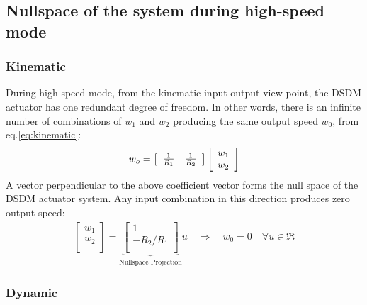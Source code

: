 \newpage
\subsection{Nullspace of the system during high-speed mode}

\subsubsection{Kinematic}

During high-speed mode, from the kinematic input-output view point, the DSDM actuator has one redundant degree of freedom. In other words, there is an infinite number of combinations of $w_1$ and $w_2$ producing the same output speed $w_0$, from eq.\eqref{eq:kinematic}:  
%
\begin{align}
w_o
 = 
\left[
\begin{array}{c c}
\frac{1}{R_1} & \frac{1}{R_2}
\end{array}
\right]
\left[
\begin{array}{c}
w_1 \\
w_2 \\
\end{array}
\right]
\end{align}
%
A vector perpendicular to the above coefficient vector forms the null space of the DSDM actuator system. Any input combination in this direction produces zero output speed:
%
\begin{align}
\left[
\begin{array}{c}
w_1 \\
w_2 \\
\end{array}
\right]=
\underbrace{\left[
\begin{array}{c}
1 \\
-R_2/R_1 \\
\end{array}
\right]}_{\text{Nullspace Projection}}
u  \quad \Rightarrow \quad
w_0 = 0 \quad \forall u \in \Re
\label{eq:kinematicnullspace}
\end{align}
%

\subsubsection{Dynamic}

